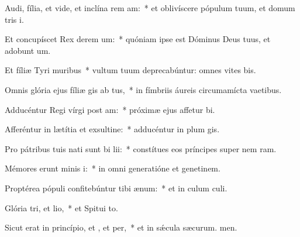 \item Audi, fília, et vide, et inclína rem am:~* et oblivíscere pópulum tuum, et domum tris i.
\item Et concupíscet Rex derem um:~* quóniam ipse est Dóminus Deus tuus, et adobunt um.
\item Et fíliæ Tyri  muribus~* vultum tuum deprecabúntur: omnes vites bis.
\item Omnis glória ejus fíliæ gis ab tus,~* in fímbriis áureis circumamícta vaetibus.
\item Adducéntur Regi vírgi post am:~* próximæ ejus affetur bi.
\item Afferéntur in lætítia et exsultine:~* adducéntur in plum gis.
\item Pro pátribus tuis nati sunt bi lii:~* constítues eos príncipes super nem ram.
\item Mémores erunt minis i:~* in omni generatióne et genetinem.
\item Proptérea pópuli confitebúntur tibi  ænum:~* et in culum culi.
\item Glória tri, et lio,~* et Spitui to.
\item Sicut erat in princípio, et , et per,~* et in sǽcula sæcurum. men.

